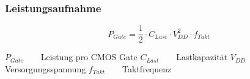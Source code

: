 \subsubsection{Leistungsaufnahme}
\begin{multicols}{2}
        \begin{minipage}{\linewidth}
\[ P_{Gate}= \frac{1}{2} \cdot C_{Last} \cdot V_{DD}^2\cdot f_{Takt} \]
    \end{minipage}
    
\begin{minipage}{\linewidth}
    $ P_{Gate} \qquad $Leistung pro CMOS Gate \newline
    $ C_{Last} \qquad $Lastkapazität\newline
    $ V_{DD}   \qquad $Versorgungsspannung\newline
    $ f_{Takt} \qquad $Taktfrequenz
\end{minipage}
\end{multicols}

